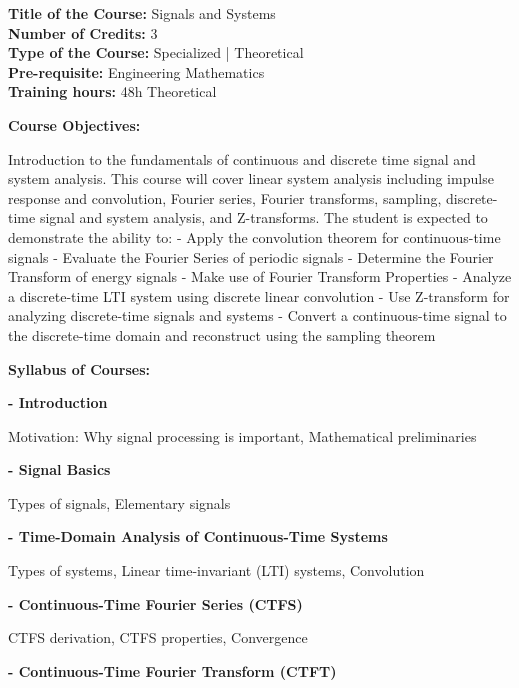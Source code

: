 \documentclass[12pt,a4paper]{article}
\begin{document}
\newpage
\textbf{Title of the Course:} Signals and Systems\\
\textbf{Number of Credits:} 3\\
\textbf{Type of the Course:} Specialized | Theoretical\\
\textbf{Pre-requisite:} Engineering Mathematics\\
\textbf{Training hours:} 48h Theoretical\par\vspace{4pt}
\textbf{Course Objectives:}\par\vspace{2pt}
Introduction to the fundamentals of continuous and discrete time signal and system analysis. This
course will cover linear system analysis including impulse response and convolution, Fourier
series, Fourier transforms, sampling, discrete-time signal and system analysis, and Z-transforms.
The student is expected to demonstrate the ability to:
- Apply the convolution theorem for continuous-time signals
- Evaluate the Fourier Series of periodic signals
- Determine the Fourier Transform of energy signals
- Make use of Fourier Transform Properties
- Analyze a discrete-time LTI system using discrete linear convolution
- Use Z-transform for analyzing discrete-time signals and systems
- Convert a continuous-time signal to the discrete-time domain and reconstruct using the
sampling theorem\par\vspace{4pt}
\textbf{Syllabus of Courses:}\par\vspace{2pt}
\vspace{2pt}\textbf{- Introduction}\par
Motivation: Why signal processing is important, Mathematical preliminaries\par
\vspace{2pt}\textbf{- Signal Basics}\par
Types of signals, Elementary signals\par
\vspace{2pt}\textbf{- Time-Domain Analysis of Continuous-Time Systems}\par
Types of systems, Linear time-invariant (LTI) systems, Convolution\par
\vspace{2pt}\textbf{- Continuous-Time Fourier Series (CTFS)}\par
CTFS derivation, CTFS properties, Convergence\par
\vspace{2pt}\textbf{- Continuous-Time Fourier Transform (CTFT)}\par
\end{document}
